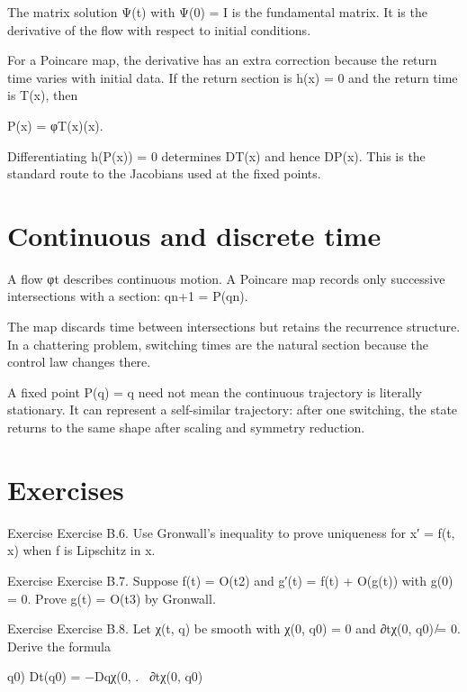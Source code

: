 The matrix solution Ψ(t) with Ψ(0) = I is the fundamental matrix. It is the derivative of the flow with respect to initial conditions.


For a Poincare map, the derivative has an extra correction because the return time varies with initial data. If the return section is h(x) = 0 and the return time is T(x), then


P(x) = φT(x)(x).


Differentiating h(P(x)) = 0 determines DT(x) and hence DP(x). This is the standard route to the Jacobians used at the fixed points.


\section{Continuous and discrete time}

A flow φt describes continuous motion. A Poincare map records only successive intersections with a section: qn+1 = P(qn).


The map discards time between intersections but retains the recurrence structure. In a chattering problem, switching times are the natural section because the control law changes there.


A fixed point P(q) = q need not mean the continuous trajectory is literally stationary. It can represent a self-similar trajectory: after one switching, the state returns to the same shape after scaling and symmetry reduction.


\section{Exercises}

\begin{statementbox}{Exercise}
Exercise B.6. Use Gronwall’s inequality to prove uniqueness for x′ = f(t, x) when f is Lipschitz in x.
\end{statementbox}

\begin{statementbox}{Exercise}
Exercise B.7. Suppose f(t) = O(t2) and g′(t) = f(t) + O(g(t)) with g(0) = 0. Prove g(t) = O(t3) by Gronwall.
\end{statementbox}

\begin{statementbox}{Exercise}
Exercise B.8. Let χ(t, q) be smooth with χ(0, q0) = 0 and ∂tχ(0, q0) ̸= 0. Derive the formula
\end{statementbox}

\begin{displaytext}
q0) Dt(q0) = −Dqχ(0, . \
∂tχ(0, q0)
\end{displaytext}

